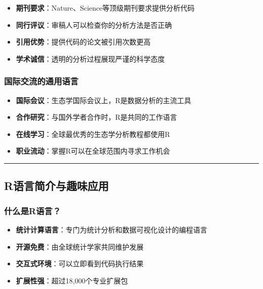 \documentclass[
]{book}
\providecommand{\tightlist}{%
  \setlength{\itemsep}{0pt}\setlength{\parskip}{0pt}}
\begin{document}
\begin{itemize}
\tightlist
\item
  \textbf{期刊要求}：Nature、Science等顶级期刊要求提供分析代码
\item
  \textbf{同行评议}：审稿人可以检查你的分析方法是否正确
\item
  \textbf{引用优势}：提供代码的论文被引用次数更高
\item
  \textbf{学术诚信}：透明的分析过程展现严谨的科学态度
\end{itemize}

\hypertarget{ux56fdux9645ux4ea4ux6d41ux7684ux901aux7528ux8bedux8a00}{%
\subsubsection{国际交流的通用语言}\label{ux56fdux9645ux4ea4ux6d41ux7684ux901aux7528ux8bedux8a00}}

\begin{itemize}
\tightlist
\item
  \textbf{国际会议}：生态学国际会议上，R是数据分析的主流工具
\item
  \textbf{合作研究}：与国外学者合作时，R是共同的工作语言
\item
  \textbf{在线学习}：全球最优秀的生态学分析教程都使用R
\item
  \textbf{职业流动}：掌握R可以在全球范围内寻求工作机会
\end{itemize}

\begin{center}\rule{0.5\linewidth}{0.5pt}\end{center}

\hypertarget{rux8bedux8a00ux7b80ux4ecbux4e0eux8da3ux5473ux5e94ux7528}{%
\subsection{R语言简介与趣味应用}\label{rux8bedux8a00ux7b80ux4ecbux4e0eux8da3ux5473ux5e94ux7528}}

\hypertarget{ux4ec0ux4e48ux662frux8bedux8a00}{%
\subsubsection{什么是R语言？}\label{ux4ec0ux4e48ux662frux8bedux8a00}}

\begin{itemize}
\tightlist
\item
  \textbf{统计计算语言}：专门为统计分析和数据可视化设计的编程语言
\item
  \textbf{开源免费}：由全球统计学家共同维护发展
\item
  \textbf{交互式环境}：可以立即看到代码执行结果
\item
  \textbf{扩展性强}：超过18,000个专业扩展包
\end{itemize}
\end{document}
